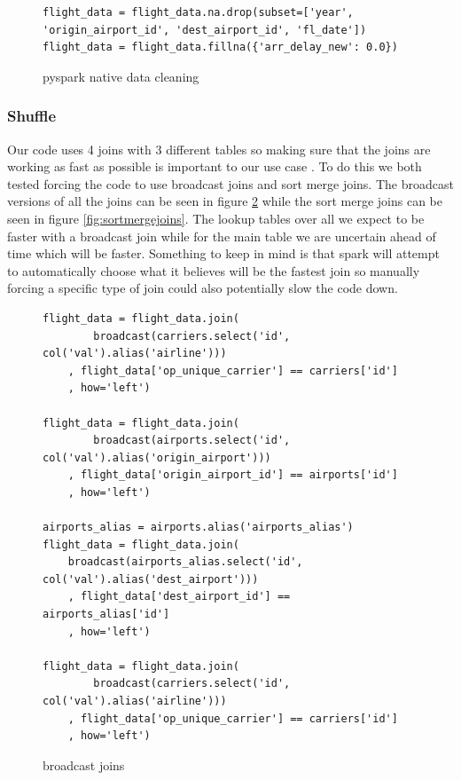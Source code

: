 \begin{figure}[H]
\centering
\begin{lstlisting}
flight_data = flight_data.na.drop(subset=['year', 'origin_airport_id', 'dest_airport_id', 'fl_date'])
flight_data = flight_data.fillna({'arr_delay_new': 0.0})
\end{lstlisting}
\caption{pyspark native data cleaning}
\label{fig:fast_data_clean}
\end{figure}

\subsubsection{Shuffle}
Our code uses 4 joins with 3 different tables so making sure that the joins are working as fast as possible is important to our use case . To do this we both tested forcing the code to use broadcast joins and sort merge joins. The broadcast versions of all the joins can be seen in figure \ref{fig:broadcast_joins} while the sort merge joins can be seen in figure \ref{fig:sortmergejoins}. The lookup tables over all we expect to be faster with a broadcast join while for the main table we are uncertain ahead of time which will be faster. Something to keep in mind is that spark will attempt to automatically choose what it believes will be the fastest join so manually forcing a specific type of join could also potentially slow the code down.

\begin{figure}[H]
\centering
\begin{lstlisting}
flight_data = flight_data.join( 
		broadcast(carriers.select('id', col('val').alias('airline')))
	, flight_data['op_unique_carrier'] == carriers['id']
	, how='left')

flight_data = flight_data.join(	
		broadcast(airports.select('id', col('val').alias('origin_airport')))
	, flight_data['origin_airport_id'] == airports['id']
	, how='left')

airports_alias = airports.alias('airports_alias')
flight_data = flight_data.join( 
    broadcast(airports_alias.select('id', col('val').alias('dest_airport')))
	, flight_data['dest_airport_id'] == airports_alias['id']
	, how='left')

flight_data = flight_data.join( 
		broadcast(carriers.select('id', col('val').alias('airline')))
	, flight_data['op_unique_carrier'] == carriers['id']
	, how='left')
\end{lstlisting}
\caption{broadcast joins}
\label{fig:broadcast_joins}
\end{figure}

